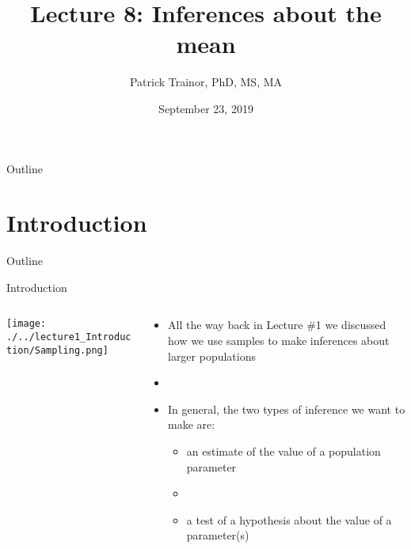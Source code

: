 \documentclass[xcolor=dvipsnames]{beamer}
\title[Lecture 8]{Lecture 8: Inferences about the mean}
\author[Patrick Trainor]{Patrick Trainor, PhD, MS, MA}
\institute[NMSU]{New Mexico State University}
\date{September 23, 2019}
\begin{document}
\begin{frame}
	\maketitle
\end{frame}

\begin{frame}{Outline}
	\tableofcontents[hideallsubsections]
\end{frame}

\section{Introduction}
\begin{frame}{Outline}
	\tableofcontents[currentsection,subsectionstyle=show/shaded/hide]
\end{frame}

\begin{frame}{Introduction}
	\begin{columns}
		\begin{column}{.4 \textwidth}
			\begin{center}
				\texttt{[image: ./../lecture1\_Introduction/Sampling.png]}
				\end{center}
		\end{column}
		\begin{column}{.5 \textwidth}
				\begin{itemize}
				\item All the way back in Lecture \#1 we discussed how we use samples to make inferences about larger populations \pause
				\item[]
				\item In general, the two types of inference we want to make are: \pause
				\begin{itemize}
					\item an estimate of the value of a population parameter \pause
					\item[]
					\item a test of a hypothesis about the value of a parameter(s)
				\end{itemize}
			\end{itemize}
		\end{column}
	\end{columns}
\end{frame}
\end{document}
